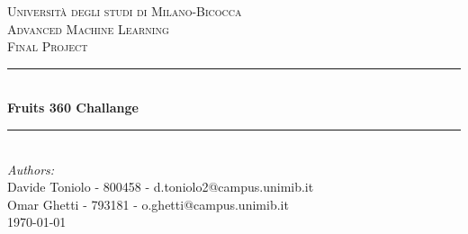 \begin{titlepage}

\newcommand{\HRule}{\rule{\linewidth}{0.5mm}} %

\center %
 

\textsc{\LARGE Università degli studi di Milano-Bicocca}\\[1cm] %
\textsc{\Large Advanced Machine Learning }\\[0.3cm] %
\textsc{\large Final Project}\\[0.1cm] %


\HRule \\[0.4cm]
{ \huge \bfseries Fruits 360 Challange}\\[0.4cm] %
\HRule \\[1.5cm]
 

\large
\emph{Authors:}\\
Davide Toniolo - 800458 - d.toniolo2@campus.unimib.it\\   %
Omar Ghetti - 793181 - o.ghetti@campus.unimib.it   \\[1cm] %



{\large \today}\\[2cm] %


\end{titlepage}
